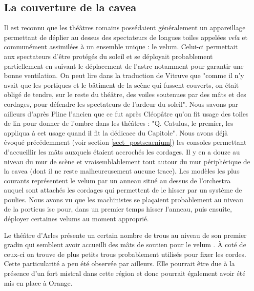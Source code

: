		\subsection{La couverture de la \gls{cavea}} \label{section velum}
		
		Il est reconnu que les théâtres romains possédaient généralement un appareillage permettant de déplier au dessus des spectateurs de longues toiles appelées \textit{vela} et communément assimilées à un ensemble unique : le \gls{velum}. Celui-ci permettait aux spectateurs d'être protégés du soleil et se déployait probablement partiellement en suivant le déplacement de l'astre notamment pour garantir une bonne ventilation. On peut lire dans la traduction de Vitruve\cite[p. 38]{vitruve} que "comme il n'y avait que les portiques et le bâtiment de la scène qui fussent couverts, on était obligé de tendre, sur le reste du théâtre, des voiles soutenues par des mâts et des cordages, pour défendre les spectateurs de l'ardeur du soleil". Nous savons par ailleurs d'après Pline l'ancien \cite[V-VI]{pline} que ce fut après Cléopâtre qu'on fit usage des toiles de lin pour donner de l'ombre dans les théâtres : "Q. Catulus, le premier, les appliqua à cet usage quand il fit la dédicace du Capitole". Nous avons déjà évoqué précédemment (voir section \ref{sect_postscaenium}) les \glspl{console} permettant d'accueillir les mâts auxquels étaient accrochés les cordages. Il y en a douze au niveau du mur de scène et vraisemblablement tout autour du mur périphérique de la \gls{cavea} (dont il ne reste malheureusement aucune trace). Les modèles les plus courants représentent le \gls{velum} par un anneau situé au dessus de l'\gls{orchestra} auquel sont attachés les cordages qui permettent de le hisser par un système de poulies. Nous avons vu que les machinistes se plaçaient probablement au niveau de la \gls{porticus isc} pour, dans un premier temps hisser l'anneau, puis ensuite, déployer certaines \glspl{velum} au moment approprié.  
		
		Le théâtre d'Arles présente un certain nombre de trous au niveau de son premier gradin qui semblent avoir accueilli des mâts de soutien pour le \gls{velum} \cite[p. 38]{formige}. \`{A} coté de ceux-ci on trouve de plus petits trous probablement utilisés pour fixer les cordes. Cette particularité a peu été observée par ailleurs. Elle pourrait être due à la présence d'un fort mistral dans cette région et donc pourrait également avoir été mis en place à Orange. 

